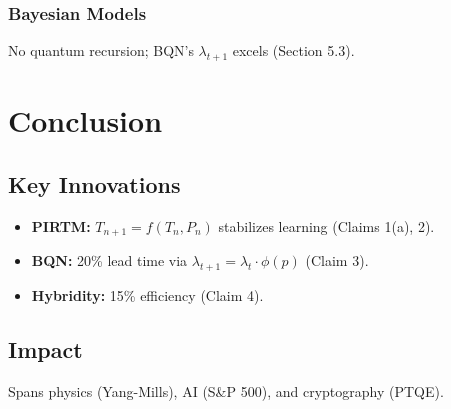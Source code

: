 \documentclass{article}
\theoremstyle{plain}
\theoremstyle{claimstyle}
\begin{document}
\subsubsection{Bayesian Models}
No quantum recursion; BQN’s \(\lambda_{t+1}\) excels (Section 5.3).

\section{Conclusion}
\subsection{Key Innovations}
\begin{itemize}
    \item \textbf{PIRTM:} \( T_{n+1} = f(T_n, P_n) \) stabilizes learning (Claims 1(a), 2).
    \item \textbf{BQN:} 20\% lead time via \(\lambda_{t+1} = \lambda_t \cdot \phi(p)\) (Claim 3).
    \item \textbf{Hybridity:} 15\% efficiency (Claim 4).
\end{itemize}

\subsection{Impact}
Spans physics (Yang-Mills), AI (S\&P 500), and cryptography (PTQE).
\end{document}
